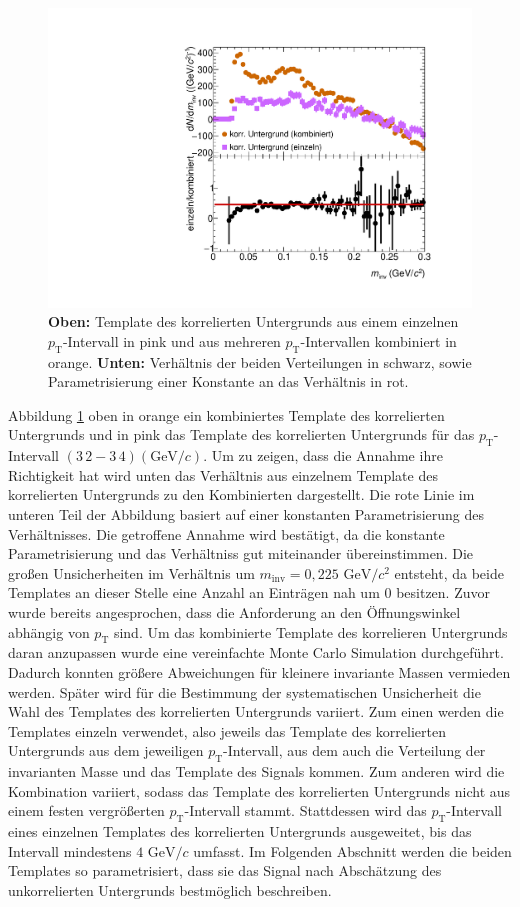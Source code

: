 \begin{figure}[tp]
\centering
\includegraphics[width=.7\linewidth]{BackgroundWithRatio10_Data_2016.pdf}
\caption{\textbf{Oben:} Template des korrelierten Untergrunds aus einem einzelnen $p_\text{T}$-Intervall in pink und aus mehreren $p_\text{T}$-Intervallen kombiniert in orange.
\textbf{Unten:} Verh\"altnis der beiden Verteilungen in schwarz, sowie Parametrisierung einer Konstante an das Verh\"altnis in rot.}
\label{fig:BkgTempRatio}
\end{figure}
\newline
Abbildung \ref{fig:BkgTempRatio} oben in orange ein kombiniertes Template des korrelierten Untergrunds und in pink das Template des korrelierten Untergrunds f\"ur das $p_\text{T}$-Intervall $(3\,2 - 3\,4) (\text{GeV/}c)$.
Um zu zeigen, dass die Annahme ihre Richtigkeit hat wird unten das Verh\"altnis aus einzelnem Template des korrelierten Untergrunds zu den Kombinierten dargestellt.
Die rote Linie im unteren Teil der Abbildung basiert auf einer konstanten Parametrisierung des Verh\"altnisses.
Die getroffene Annahme wird best\"atigt, da die konstante Parametrisierung und das Verh\"altniss gut miteinander \"ubereinstimmen.
Die gro{\ss}en Unsicherheiten im Verh\"altnis um $m_\text{inv} = 0,225\text{ GeV}/c^{2}$ entsteht, da beide Templates an dieser Stelle eine Anzahl an Eintr\"agen nah um 0 besitzen.
\newline
Zuvor wurde bereits angesprochen, dass die Anforderung an den \"Offnungswinkel abh\"angig von $p_\text{T}$ sind.
Um das kombinierte Template des korrelieren Untergrunds daran anzupassen wurde eine vereinfachte Monte Carlo Simulation durchgef\"uhrt.
Dadurch konnten gr\"o{\ss}ere Abweichungen f\"ur kleinere invariante Massen vermieden werden.
\newline
Sp\"ater wird f\"ur die Bestimmung der systematischen Unsicherheit die Wahl des Templates des korrelierten Untergrunds variiert.
Zum einen werden die Templates einzeln verwendet, also jeweils das Template des korrelierten Untergrunds aus dem jeweiligen $p_\text{T}$-Intervall, aus dem auch die Verteilung der invarianten Masse und das Template des Signals kommen.
Zum anderen wird die Kombination variiert, sodass das Template des korrelierten Untergrunds nicht aus einem festen vergr\"o{\ss}erten $p_\text{T}$-Intervall stammt.
Stattdessen wird das $p_\text{T}$-Intervall eines einzelnen Templates des korrelierten Untergrunds ausgeweitet, bis das Intervall mindestens $4\text{ GeV}/c$ umfasst.
\newline
Im Folgenden Abschnitt werden die beiden Templates so parametrisiert, dass sie das Signal nach Absch\"atzung des unkorrelierten Untergrunds bestm\"oglich beschreiben.